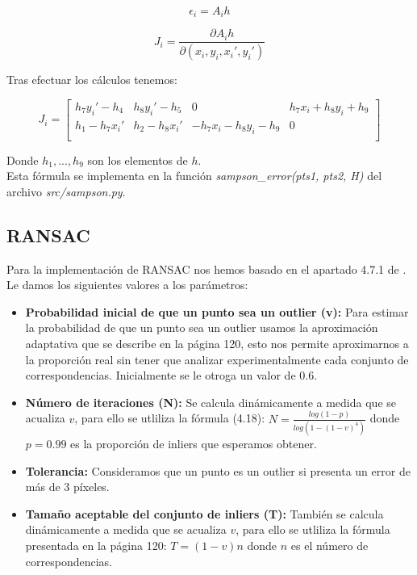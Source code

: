 $$\epsilon_i = A_ih$$

$$J_i = \frac{\partial A_ih}{\partial (x_i, y_i, x_i', y_i')}$$

Tras efectuar los cálculos tenemos:

$$J_i =
  \begin{bmatrix}
    h_7 y_i' - h_4 & h_8 y_i' - h_5 & 0 &  h_7 x_i + h_8 y_i + h_9\\
    h_1 - h_7 x_i' & h_2 - h_8 x_i' & -h_7 x_i - h_8 y_i - h_9 & 0\\
  \end{bmatrix}
$$

Donde $h_1,...,h_9$ son los elementos de $h$.\\

Esta fórmula se implementa en la función \textit{sampson\_error(pts1, pts2, H)} del archivo \textit{src/sampson.py}.


\subsection{RANSAC}

Para la implementación de RANSAC nos hemos basado en el apartado 4.7.1 de \cite{mvg}. Le damos los siguientes valores a los parámetros:

\begin{itemize}
  \item \textbf{Probabilidad inicial de que un punto sea un outlier (v):}
  Para estimar la probabilidad de que un punto sea un outlier usamos la aproximación adaptativa que se describe en la página 120, esto nos permite aproximarnos a la proporción real sin tener que analizar experimentalmente cada conjunto de correspondencias. Inicialmente se le otroga un valor de $0.6$.\\
  
  \item \textbf{Número de iteraciones (N):}
  Se calcula dinámicamente a medida que se acualiza $v$, para ello se utliliza la fórmula (4.18):
  $N = \frac{log(1-p)}{log(1-(1-v)^4)}$ donde $p=0.99$ es la proporción de inliers que esperamos obtener.\\
  
  \item \textbf{Tolerancia:}
  Consideramos que un punto es un outlier si presenta un error de más de 3 píxeles.\\
  
  \item \textbf{Tamaño aceptable del conjunto de inliers (T):}
  También se calcula dinámicamente a medida que se acualiza $v$, para ello se utliliza la fórmula presentada en la página 120: $T = (1-v)n$ donde $n$ es el número de correspondencias.\\
\end{itemize}

